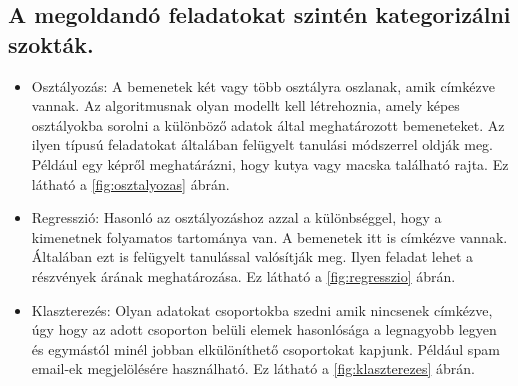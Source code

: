 \subsection{A megoldandó feladatokat szintén kategorizálni szokták.}
\begin{itemize}
    \item Osztályozás: A bemenetek két vagy több osztályra oszlanak, amik címkézve vannak. Az algoritmusnak olyan modellt kell létrehoznia, amely képes osztályokba sorolni a különböző adatok által meghatározott bemeneteket. Az ilyen típusú feladatokat általában felügyelt tanulási módszerrel oldják meg. Például egy képről meghatárázni, hogy kutya vagy macska található rajta. Ez látható a \ref{fig:osztalyozas} ábrán.
    \item Regresszió: Hasonló az osztályozáshoz azzal a különbséggel, hogy a kimenetnek folyamatos tartománya van. A bemenetek itt is címkézve vannak. Általában ezt is felügyelt tanulással valósítják meg. Ilyen feladat lehet a részvények árának meghatározása. Ez látható a \ref{fig:regresszio} ábrán.
    \item Klaszterezés: Olyan adatokat csoportokba szedni amik nincsenek címkézve, úgy hogy az adott csoporton belüli elemek hasonlósága a legnagyobb legyen és egymástól minél jobban elkülöníthető csoportokat kapjunk. Például spam email-ek megjelölésére használható. Ez látható a \ref{fig:klaszterezes} ábrán.
\end{itemize}
